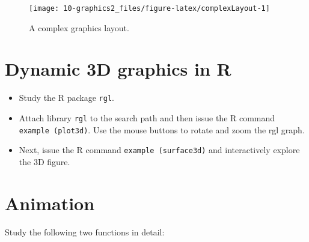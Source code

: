 \documentclass[
]{book}
\begin{document}
\begin{figure}
\texttt{[image: 10-graphics2\_files/figure-latex/complexLayout-1]} \caption{A complex graphics layout.}\label{fig:complexLayout}
\end{figure}

\section{Dynamic 3D graphics in R}\label{dynamic-3d-graphics-in-r}

\begin{itemize}
\item
  Study the R package \texttt{rgl}.
\item
  Attach library \texttt{rgl} to the search path and then issue the R command \texttt{example\ (plot3d)}. Use the mouse buttons to rotate and zoom the rgl graph.
\item
  Next, issue the R command \texttt{example\ (surface3d)} and interactively explore the 3D figure.
\end{itemize}

\section{Animation}\label{animation}

Study the following two functions in detail:
\end{document}
